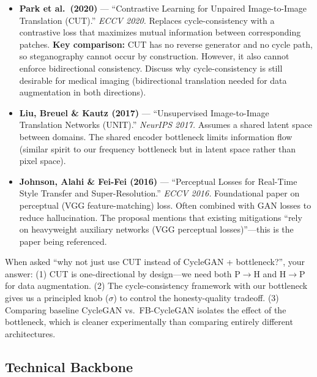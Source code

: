 \documentclass[11pt,a4paper]{article}
\theoremstyle{definition}
\begin{document}
\begin{itemize}
    \item \textbf{Park et al.\ (2020)} --- ``Contrastive Learning for Unpaired Image-to-Image Translation (CUT).'' \textit{ECCV 2020.} Replaces cycle-consistency with a contrastive loss that maximizes mutual information between corresponding patches. \textbf{Key comparison:} CUT has no reverse generator and no cycle path, so steganography cannot occur by construction. However, it also cannot enforce bidirectional consistency. Discuss why cycle-consistency is still desirable for medical imaging (bidirectional translation needed for data augmentation in both directions).

    \item \textbf{Liu, Breuel \& Kautz (2017)} --- ``Unsupervised Image-to-Image Translation Networks (UNIT).'' \textit{NeurIPS 2017.} Assumes a shared latent space between domains. The shared encoder bottleneck limits information flow (similar spirit to our frequency bottleneck but in latent space rather than pixel space).

    \item \textbf{Johnson, Alahi \& Fei-Fei (2016)} --- ``Perceptual Losses for Real-Time Style Transfer and Super-Resolution.'' \textit{ECCV 2016.} Foundational paper on perceptual (VGG feature-matching) loss. Often combined with GAN losses to reduce hallucination. The proposal mentions that existing mitigations ``rely on heavyweight auxiliary networks (VGG perceptual losses)''---this is the paper being referenced.
\end{itemize}

\begin{keyinsight}
When asked ``why not just use CUT instead of CycleGAN + bottleneck?'', your answer: (1) CUT is one-directional by design---we need both P$\to$H and H$\to$P for data augmentation. (2) The cycle-consistency framework with our bottleneck gives us a principled knob ($\sigma$) to control the honesty-quality tradeoff. (3) Comparing baseline CycleGAN vs.\ FB-CycleGAN isolates the effect of the bottleneck, which is cleaner experimentally than comparing entirely different architectures.
\end{keyinsight}

\subsection{Technical Backbone}
\end{document}
